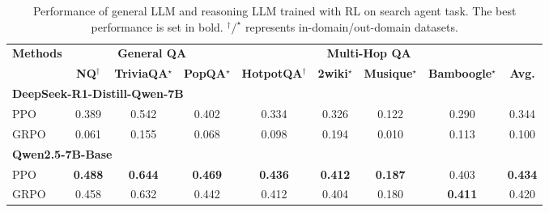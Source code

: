 \begin{table}[t]
    \centering
    \scriptsize
    \setlength{\tabcolsep}{4pt}
    
    \caption{Performance of general LLM and reasoning LLM trained with RL on search agent task. The best performance is set in bold. $^\dagger/^\star$ represents in-domain/out-domain datasets.}\label{tab:llm-type}
    \begin{tabular}{lcccccccc}
        \toprule
        \textbf{Methods} & \multicolumn{3}{c}{\textbf{General QA}} & \multicolumn{4}{c}{\textbf{Multi-Hop QA}} \\
        
        \cmidrule(lr){2-4} \cmidrule(lr){5-8}
         & \textbf{NQ$^\dagger$} & \textbf{TriviaQA$^\star$} & \textbf{PopQA$^\star$} & \textbf{HotpotQA$^\dagger$} & \textbf{2wiki$^\star$} & \textbf{Musique$^\star$} & \textbf{Bamboogle$^\star$} & \textbf{Avg.} \\
        \midrule
        \multicolumn{9}{l}{\textbf{DeepSeek-R1-Distill-Qwen-7B}} \\
        \hdashline
        PPO & 0.389 & 0.542 & 0.402 & 0.334 & 0.326 & 0.122 & 0.290 & 0.344  \\
        
        GRPO &  0.061 & 0.155 & 0.068 & 0.098 & 0.194 & 0.010 & 0.113 & 0.100 \\
        \midrule
        \multicolumn{9}{l}{\textbf{Qwen2.5-7B-Base}} \\
        \hdashline
        PPO & \textbf{0.488} & \textbf{0.644} & \textbf{0.469} & \textbf{0.436} & \textbf{0.412} & \textbf{0.187} & 0.403 & \textbf{0.434} \\
        
        GRPO &  0.458 & 0.632 & 0.442 & 	0.412 & 0.404 & 0.180 & \textbf{0.411} & 0.420  \\
        \bottomrule
    \end{tabular}
\end{table}

